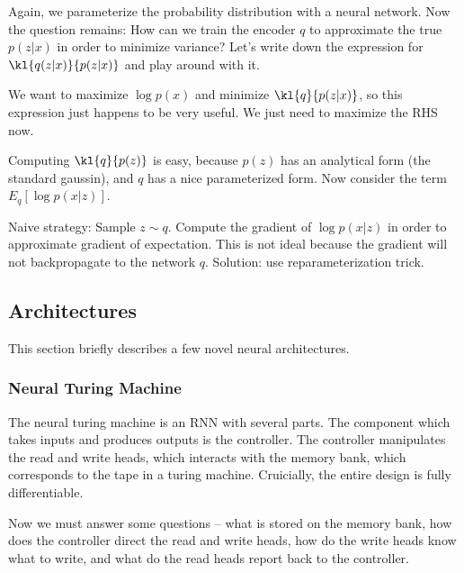 \documentclass[12pt]{article}
\begin{document}
Again, we parameterize the probability distribution with a neural network. Now the question remains: How can we train the encoder $q$ to approximate the true $p(z|x)$ in order to minimize variance? Let's write down the expression for $\kl{q(z|x)}{p(z|x)}$ and play around with it.


We want to maximize $\log p(x)$ and minimize $\kl{q}{p(z|x)}$, so this expression just happens to be very useful. We just need to maximize the RHS now.

Computing $\kl{q}{p(z)}$ is easy, because $p(z)$ has an analytical form (the standard gaussin), and $q$ has a nice parameterized form. Now consider the term $E_q[\log p(x|z)]$. 

Naive strategy: Sample $z \sim q$. Compute the gradient of $\log p(x|z)$ in order to approximate gradient of expectation. This is not ideal because the gradient will not backpropagate to the network $q$. Solution: use reparameterization trick.  

\subsection{Architectures}

This section briefly describes a few novel neural architectures.

\subsubsection{Neural Turing Machine}

The neural turing machine is an RNN with several parts. The component which takes inputs and produces outputs is the controller. The controller manipulates the read and write heads, which interacts with the memory bank, which corresponds to the tape in a turing machine. Cruicially, the entire design is fully differentiable. 

Now we must answer some questions -- what is stored on the memory bank, how does the controller direct the read and write heads, how do the write heads know what to write, and what do the read heads report back to the controller.
\end{document}
